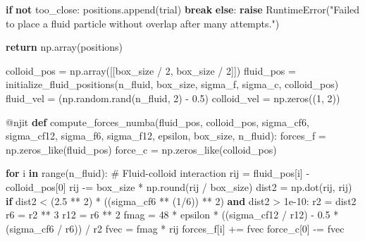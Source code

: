 \documentclass[
  letterpaper,
  enabledeprecatedfontcommands]{report}
\newenvironment{Shaded}{\begin{snugshade}}{\end{snugshade}}
\newcommand{\AttributeTok}[1]{\textcolor[rgb]{0.40,0.45,0.13}{#1}}
\newcommand{\BuiltInTok}[1]{\textcolor[rgb]{0.00,0.23,0.31}{#1}}
\newcommand{\CommentTok}[1]{\textcolor[rgb]{0.37,0.37,0.37}{#1}}
\newcommand{\ControlFlowTok}[1]{\textcolor[rgb]{0.00,0.23,0.31}{\textbf{#1}}}
\newcommand{\DecValTok}[1]{\textcolor[rgb]{0.68,0.00,0.00}{#1}}
\newcommand{\FloatTok}[1]{\textcolor[rgb]{0.68,0.00,0.00}{#1}}
\newcommand{\KeywordTok}[1]{\textcolor[rgb]{0.00,0.23,0.31}{\textbf{#1}}}
\newcommand{\NormalTok}[1]{\textcolor[rgb]{0.00,0.23,0.31}{#1}}
\newcommand{\OperatorTok}[1]{\textcolor[rgb]{0.37,0.37,0.37}{#1}}
\newcommand{\PreprocessorTok}[1]{\textcolor[rgb]{0.68,0.00,0.00}{#1}}
\newcommand{\StringTok}[1]{\textcolor[rgb]{0.13,0.47,0.30}{#1}}
\begin{document}
\begin{Shaded}
\begin{Highlighting}[]
            \ControlFlowTok{if} \KeywordTok{not}\NormalTok{ too\_close:}
\NormalTok{                positions.append(trial)}
                \ControlFlowTok{break}
        \ControlFlowTok{else}\NormalTok{:}
            \ControlFlowTok{raise} \PreprocessorTok{RuntimeError}\NormalTok{(}\StringTok{"Failed to place a fluid particle without overlap after many attempts."}\NormalTok{)}
    
    \ControlFlowTok{return}\NormalTok{ np.array(positions)}

\NormalTok{colloid\_pos }\OperatorTok{=}\NormalTok{ np.array([[box\_size }\OperatorTok{/} \DecValTok{2}\NormalTok{, box\_size }\OperatorTok{/} \DecValTok{2}\NormalTok{]])}
\NormalTok{fluid\_pos }\OperatorTok{=}\NormalTok{ initialize\_fluid\_positions(n\_fluid, box\_size, sigma\_f, sigma\_c, colloid\_pos)}
\NormalTok{fluid\_vel }\OperatorTok{=}\NormalTok{ (np.random.rand(n\_fluid, }\DecValTok{2}\NormalTok{) }\OperatorTok{{-}} \FloatTok{0.5}\NormalTok{)}
\NormalTok{colloid\_vel }\OperatorTok{=}\NormalTok{ np.zeros((}\DecValTok{1}\NormalTok{, }\DecValTok{2}\NormalTok{))}

\AttributeTok{@njit}
\KeywordTok{def}\NormalTok{ compute\_forces\_numba(fluid\_pos, colloid\_pos, sigma\_cf6, sigma\_cf12, sigma\_f6, sigma\_f12, epsilon, box\_size, n\_fluid):}
\NormalTok{    forces\_f }\OperatorTok{=}\NormalTok{ np.zeros\_like(fluid\_pos)}
\NormalTok{    force\_c }\OperatorTok{=}\NormalTok{ np.zeros\_like(colloid\_pos)}

    \ControlFlowTok{for}\NormalTok{ i }\KeywordTok{in} \BuiltInTok{range}\NormalTok{(n\_fluid):}
        \CommentTok{\# Fluid{-}colloid interaction}
\NormalTok{        rij }\OperatorTok{=}\NormalTok{ fluid\_pos[i] }\OperatorTok{{-}}\NormalTok{ colloid\_pos[}\DecValTok{0}\NormalTok{]}
\NormalTok{        rij }\OperatorTok{{-}=}\NormalTok{ box\_size }\OperatorTok{*}\NormalTok{ np.}\BuiltInTok{round}\NormalTok{(rij }\OperatorTok{/}\NormalTok{ box\_size)}
\NormalTok{        dist2 }\OperatorTok{=}\NormalTok{ np.dot(rij, rij)}
        \ControlFlowTok{if}\NormalTok{ dist2 }\OperatorTok{\textless{}}\NormalTok{ (}\FloatTok{2.5} \OperatorTok{**} \DecValTok{2}\NormalTok{) }\OperatorTok{*}\NormalTok{ ((sigma\_cf6 }\OperatorTok{**}\NormalTok{ (}\DecValTok{1}\OperatorTok{/}\DecValTok{6}\NormalTok{)) }\OperatorTok{**} \DecValTok{2}\NormalTok{) }\KeywordTok{and}\NormalTok{ dist2 }\OperatorTok{\textgreater{}} \FloatTok{1e{-}10}\NormalTok{:}
\NormalTok{            r2 }\OperatorTok{=}\NormalTok{ dist2}
\NormalTok{            r6 }\OperatorTok{=}\NormalTok{ r2 }\OperatorTok{**} \DecValTok{3}
\NormalTok{            r12 }\OperatorTok{=}\NormalTok{ r6 }\OperatorTok{**} \DecValTok{2}
\NormalTok{            fmag }\OperatorTok{=} \DecValTok{48} \OperatorTok{*}\NormalTok{ epsilon }\OperatorTok{*}\NormalTok{ ((sigma\_cf12 }\OperatorTok{/}\NormalTok{ r12) }\OperatorTok{{-}} \FloatTok{0.5} \OperatorTok{*}\NormalTok{ (sigma\_cf6 }\OperatorTok{/}\NormalTok{ r6)) }\OperatorTok{/}\NormalTok{ r2}
\NormalTok{            fvec }\OperatorTok{=}\NormalTok{ fmag }\OperatorTok{*}\NormalTok{ rij}
\NormalTok{            forces\_f[i] }\OperatorTok{+=}\NormalTok{ fvec}
\NormalTok{            force\_c[}\DecValTok{0}\NormalTok{] }\OperatorTok{{-}=}\NormalTok{ fvec}


\end{Highlighting}
\end{Shaded}
\end{document}
